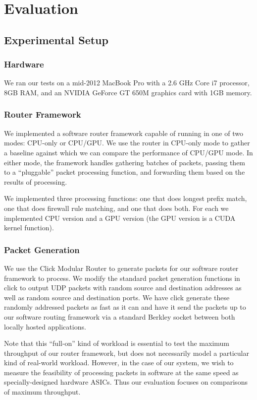 \section{Evaluation}
\label{sec:eval}

\subsection{Experimental Setup}

\subsubsection{Hardware}

We ran our tests on a mid-2012 MacBook Pro with a 2.6 GHz Core i7 processor,
8GB RAM, and an NVIDIA GeForce GT 650M graphics card with 1GB memory.


\subsubsection{Router Framework}

We implemented a software router framework capable of running in one of two
modes: CPU-only or CPU/GPU. We use the router in CPU-only mode to gather a
baseline against which we can compare the performance of CPU/GPU mode. In
either mode, the framework handles gathering batches of packets, passing them
to a ``pluggable'' packet processing function, and forwarding them based on the
results of processing. 

We implemented three processing functions: one that does longest prefix match,
one that does firewall rule matching, and one that does both. For each we
implemented CPU version and a GPU version (the GPU version is a CUDA kernel
function).

\subsubsection{Packet Generation}
We use the Click Modular Router \cite{kohler2000click} to generate packets for our
software router framework to process. We modify the standard packet generation
functions in click to output UDP packets with random source and destination
addresses as well as random source and destination ports. We have click generate
these randomly addressed packets as fast as it can and have it send the packets
up to our software routing framework via a standard Berkley socket between both
locally hosted applications.

Note that this ``full-on'' kind of workload is essential to test the maximum
throughput of our router framework, but does not necessarily model a particular
kind of real-world workload. However, in the case of our system, we wish to
measure the feasibility of processing packets in software at the same speed as
specially-designed hardware ASICs. Thus our evaluation focuses on comparisons
of maximum throughput.


